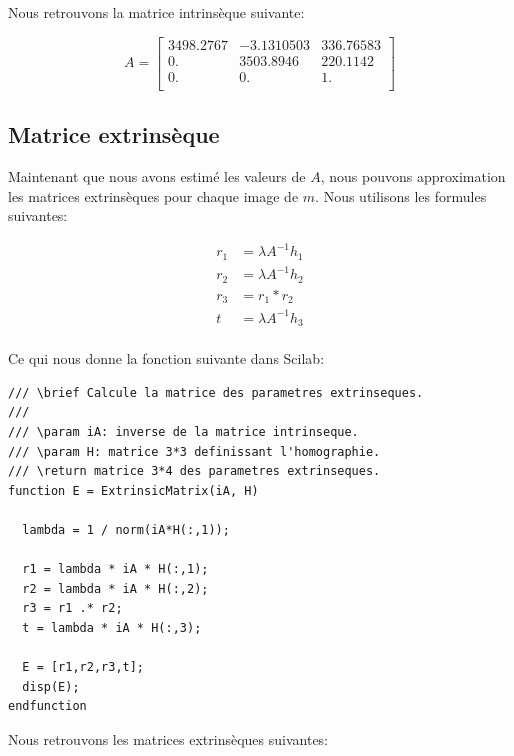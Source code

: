 \documentclass[a4paper,11pt]{article}
\begin{document}
Nous retrouvons la matrice intrinsèque suivante:

\begin{equation}
  A =
  \begin{bmatrix}
      3498.2767 & - 3.1310503  &  336.76583 \\  
      0.        &   3503.8946  &  220.1142  \\
      0.        &   0.         &  1.\\
  \end{bmatrix}
\end{equation}


\subsection{Matrice extrinsèque}

Maintenant que nous avons estimé les valeurs de $A$, nous pouvons approximation les
matrices extrinsèques pour chaque image de $m$. Nous utilisons les formules suivantes:

\begin{equation}
  \begin{aligned}
    r_1 &= \lambda A^{-1} h_1\\
    r_2 &= \lambda A^{-1} h_2\\
    r_3 &= r_1 * r_2\\
    t &= \lambda A^{-1} h_3\\
  \end{aligned}
\end{equation}

Ce qui nous donne la fonction suivante dans Scilab:

\begin{lstlisting}[caption=Fonction d'approximation de la matrice extrinsèque]
/// \brief Calcule la matrice des parametres extrinseques.
///
/// \param iA: inverse de la matrice intrinseque.
/// \param H: matrice 3*3 definissant l'homographie.
/// \return matrice 3*4 des parametres extrinseques.
function E = ExtrinsicMatrix(iA, H)
  
  lambda = 1 / norm(iA*H(:,1));
  
  r1 = lambda * iA * H(:,1);
  r2 = lambda * iA * H(:,2);
  r3 = r1 .* r2;
  t = lambda * iA * H(:,3);
  
  E = [r1,r2,r3,t];
  disp(E);
endfunction
\end{lstlisting}

Nous retrouvons les matrices extrinsèques suivantes:
\end{document}
